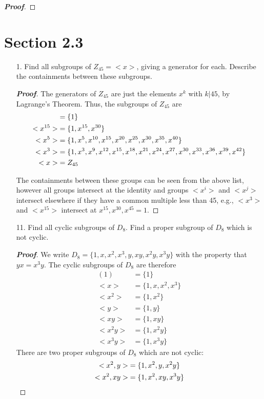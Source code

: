 \documentclass[12pt,leqno]{book}
\theoremstyle{definition}
\newenvironment{Proof}{\begin{proof}[\textnormal{\textbf{Proof}}]}{\end{proof}}
\begin{document}
\begin{enumerate}
\begin{Proof}
\end{Proof}

\end{enumerate}

\section*{Section 2.3}
\begin{enumerate}
 \item [1.] Find all subgroups of $Z_{45}=<x>$, giving a generator for each. Describe the containments between these subgroups.
\begin{Proof}
 The generators of $Z_{45}$ are just the elements $x^k$ with $k|45$, by Lagrange's Theorem. Thus, the subgroups of $Z_{45}$ are\begin{align*}<1>&=\{1\}\\<x^{15}>&=\{1,x^{15},x^{30}\}\\<x^5>&=\{1,x^5,x^{10},x^{15},x^{20},x^{25},x^{30},x^{35},x^{40}\}\\<x^3>&=\{1,x^3,x^9,x^{12},x^{15},x^{18},x^{21},x^{24},x^{27},x^{30},x^{33},x^{36},x^{39},x^{42}\}\\<x>&=Z_{45}\qedhere\end{align*} 

The containments between these groups can be seen from the above list, however all groups intersect at the identity and groups $<x^i>$ and $<x^j>$ intersect elsewhere if they have a common multiple less than 45, e.g., $<x^3>$ and $<x^15>$ intersect at $x^{15},x^{30},x^{45}=1$.
\end{Proof}

 \item [11.] Find all cyclic subgroups of $D_8$. Find a proper subgroup of $D_8$ which is not cyclic.
\begin{Proof}
 We write $D_8=\{1,x,x^2,x^3,y,xy,x^2y,x^3y\}$ with the property that $yx=x^3y$. The cyclic subgroups of $D_8$ are therefore \begin{align*}(1)&=\{1\}\\<x>&=\{1,x,x^2,x^3\}\\<x^2>&=\{1,x^2\}\\<y>&=\{1,y\}\\<xy>&=\{1,xy\}\\<x^2y>&=\{1,x^2y\}\\<x^3y>&=\{1,x^3y\}\end{align*} There are two proper subgroups of $D_8$ which are not cyclic: \begin{align*}<x^2,y>&=\{1,x^2,y,x^2y\}\\<x^2,xy>&=\{1,x^2,xy,x^3y\}\qedhere\end{align*}
\end{Proof}


\end{enumerate}
\end{document}
